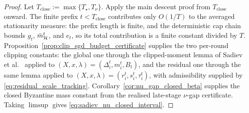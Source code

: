 \begin{proof}
Let \(T_{\mathrm{close}}:=\max\{T_\star,T_\nu\}\). Apply the main descent proof
from \(T_{\mathrm{close}}\) onward. The finite prefix
\(t<T_{\mathrm{close}}\) contributes only \(O(1/T)\) to the averaged
stationarity measure: the prefix length is finite, and the deterministic cap
chain bounds \(g_t\), \(\bar m_{\mathcal{H}}^t\), and \(e_t\), so its total contribution
is a finite constant divided by \(T\).
Proposition~\ref{prop:clip_sgd_budget_certificate} supplies the two per-round
clipping constants: the global one through the clipped-moment lemma of
Sadiev et al.~\cite[Lemma~5.1]{sadiev2023highprob} applied to
\((X,x,\lambda)=(\Delta_i^t,m_i^t,B_t)\), and the residual one through the
same lemma applied to
\((X,x,\lambda)=(r_i^t,s_i^t,\tau_i^t)\), with admissibility supplied by
\eqref{eq:residual_scale_tracking}. Corollary~\ref{cor:nu_gap_closed_beta}
supplies the closed Byzantine mass constant from the realised late-stage
\(\nu\)-gap certificate. Taking \(\limsup\) gives
\eqref{eq:sadiev_nu_closed_interval}.
\end{proof}


